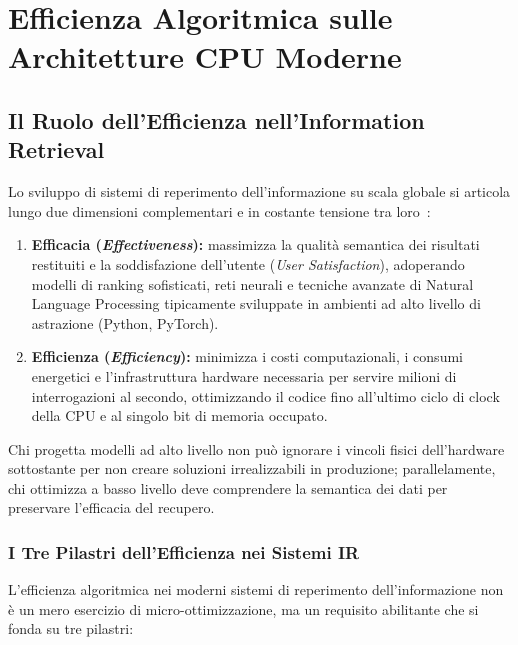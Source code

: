 \chapter{Efficienza Algoritmica sulle Architetture CPU Moderne}
\label{chap:efficienza-cpu}

\FloatBarrier
\section{Il Ruolo dell'Efficienza nell'Information Retrieval}
\label{sec:ruolo-efficienza-ir}

Lo sviluppo di sistemi di reperimento dell'informazione su scala globale si articola lungo due dimensioni complementari e in costante tensione tra loro~\cite{manning2008,buttcher2010}:

\begin{enumerate}
    \item \textbf{Efficacia (\textit{Effectiveness}):} massimizza la qualit\`a semantica dei risultati restituiti e la soddisfazione dell'utente (\textit{User Satisfaction}), adoperando modelli di ranking sofisticati, reti neurali e tecniche avanzate di Natural Language Processing tipicamente sviluppate in ambienti ad alto livello di astrazione (Python, PyTorch).
    \item \textbf{Efficienza (\textit{Efficiency}):} minimizza i costi computazionali, i consumi energetici e l'infrastruttura hardware necessaria per servire milioni di interrogazioni al secondo, ottimizzando il codice fino all'ultimo ciclo di clock della CPU e al singolo bit di memoria occupato.
\end{enumerate}

Chi progetta modelli ad alto livello non pu\`o ignorare i vincoli fisici dell'hardware sottostante per non creare soluzioni irrealizzabili in produzione; parallelamente, chi ottimizza a basso livello deve comprendere la semantica dei dati per preservare l'efficacia del recupero.

\FloatBarrier
\subsection{I Tre Pilastri dell'Efficienza nei Sistemi IR}
\label{subsec:tre-pilastri-efficienza}

L'efficienza algoritmica nei moderni sistemi di reperimento dell'informazione non \`e un mero esercizio di micro-ottimizzazione, ma un requisito abilitante che si fonda su tre pilastri:

